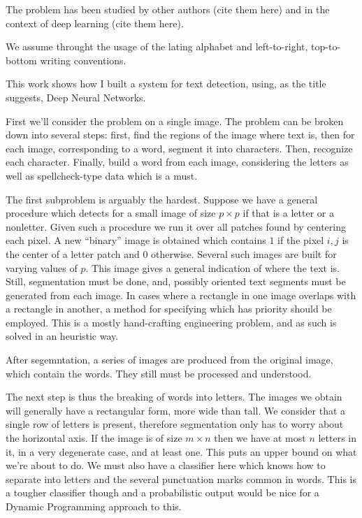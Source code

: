 \documentclass[12pt,a4paper,oneside,english]{UPBThesis}
\newcommand{\hctimes}[2]{{#1}\!\times\!{#2}}
\begin{document}
The problem has been studied by other authors (cite them here) and in the context of deep learning (cite them here).

We assume throught the usage of the lating alphabet and left-to-right, top-to-bottom writing conventions.

This work shows how I built a system for text detection, using, as the title suggests, Deep Neural Networks.

First we'll consider the problem on a single image. The problem can be broken down into several steps: first, find the regions of the image where text is, then for each image, corresponding to a word, segment it into characters. Then, recognize each character. Finally, build a word from each image, considering the letters as well as spellcheck-type data which is a must.

The first subproblem is arguably the hardest. Suppose we have a general procedure which detects for a small image of size $\hctimes{p}{p}$ if that is a letter or a nonletter. Given such a procedure we run it over all patches found by centering each pixel. A new ``binary'' image is obtained which contains $1$ if the pixel $i,j$ is the center of a letter patch and $0$ otherwise. Several such images are built for varying values of $p$. This image gives a general indication of where the text is. Still, segmentation must be done, and, possibly oriented text segments must be generated from each image. In cases where a rectangle in one image overlaps with a rectangle in another, a method for specifying which has priority should be employed. This is a mostly hand-crafting engineering problem, and as such is solved in an heuristic way.

After segemntation, a series of images are produced from the original image, which contain the words. They still must be processed and understood.

The next step is thus the breaking of words into letters. The images we obtain will generally have a rectangular form, more wide than tall. We consider that a single row of letters is present, therefore segmentation only has to worry about the horizontal axis. If the image is of size $\hctimes{m}{n}$ then we have at most $n$ letters in it, in a very degenerate case, and at least one. This puts an upper bound on what we're about to do. We must also have a classifier here which knows how to separate into letters and the several punctuation marks common in words. This is a tougher classifier though and a probabilistic output would be nice for a Dynamic Programming approach to this.
\end{document}
